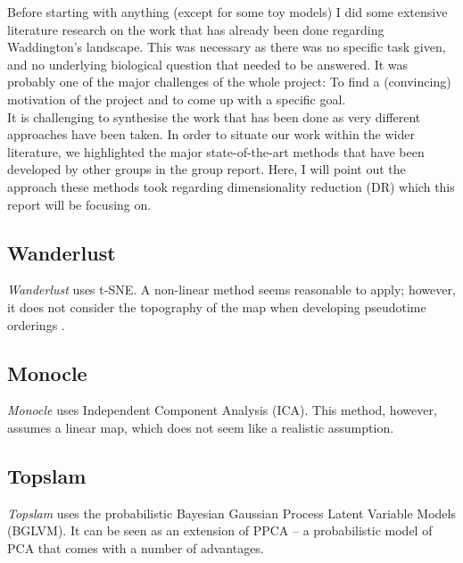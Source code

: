 \documentclass[journal, a4paper]{IEEEtran}
\begin{document}
Before starting with anything (except for some toy models) I did some extensive literature research on the work that has already been done regarding Waddington's landscape. This was necessary as there was no specific task given, and no underlying biological question that needed to be answered. It was probably one of the major challenges of the whole project: To find a (convincing) motivation of the project and to come up with a specific goal.\\
It is challenging to synthesise the work that has been done as very different approaches have been taken. In order to situate our work within the wider literature, we highlighted the major state-of-the-art methods that have been developed by other groups in the group report.
Here, I will point out the approach these methods took regarding dimensionality reduction (DR) which this report will be focusing on. 


\subsection{Wanderlust}
\textit{Wanderlust} \cite{wanderlust} uses t-SNE. A non-linear method seems reasonable to apply; however, it does not consider the topography of the map when developing pseudotime orderings \cite{hopland}.


\subsection{Monocle}
\textit{Monocle} \cite{monocle} uses Independent Component Analysis (ICA). This method, however, assumes a linear map, which does not seem like a realistic assumption.

\subsection{Topslam}
\textit{Topslam} \cite{topslam} uses the probabilistic Bayesian Gaussian Process Latent Variable Models (BGLVM). It can be seen as an extension of PPCA -- a probabilistic model of PCA that comes with a number of advantages.
\end{document}
